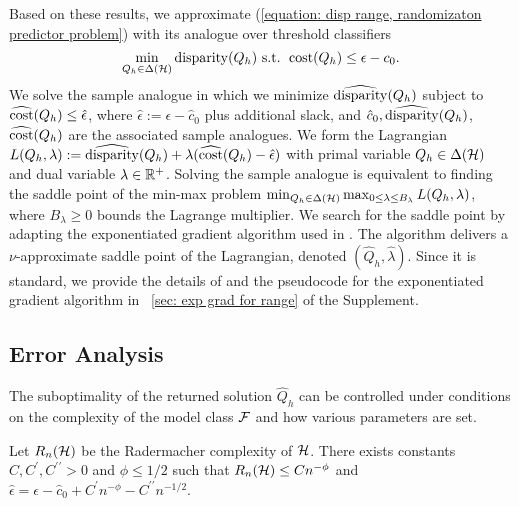 \documentclass{article}
\begin{document}
Based on these results, we approximate (\ref{equation: disp range, randomizaton predictor problem}) with its analogue over threshold classifiers
    \begin{equation}\label{equation: discretized problem for extremes}
        \min_{Q_h \in \Delta(\mathcal{H})} \operatorname{disparity}(Q_h) \mbox{ s.t. } \operatorname{cost}(Q_h) \leq \epsilon - c_0.
    \end{equation}
We solve the sample analogue in which we minimize $\widehat{\operatorname{disparity}}(Q_h)$ subject to $\widehat{\operatorname{cost}}(Q_h) \leq \hat{\epsilon}$, where $\hat{\epsilon} := \epsilon - \hat{c}_0$ plus additional slack, and $\hat{c}_0, \widehat{\operatorname{disparity}}(Q_h)$, $\widehat{\operatorname{cost}}(Q_h)$ are the associated sample analogues. We form the Lagrangian $L(Q_h, \lambda) := \widehat{\operatorname{disparity}}(Q_h) + \lambda (\widehat{\operatorname{cost}}(Q_h) - \hat{\epsilon})$ with primal variable $Q_h \in \Delta(\mathcal{H})$ and dual variable $\lambda \in \mathbb{R}^{+}$. Solving the sample analogue is equivalent to finding the saddle point of the min-max problem $ \min_{Q_h \in \Delta(\mathcal{H})} \max_{0 \leq \lambda \leq B_\lambda} L(Q_h, \lambda)$, where $B_\lambda \geq 0$ bounds the Lagrange multiplier. We search for the saddle point by adapting the exponentiated gradient algorithm used in \cite{agarwal2018reductions, AgarwalEtAl(19)-FairRegression}. The algorithm delivers a $\nu$-approximate saddle point of the Lagrangian, denoted $(\hat{Q}_h, \hat{\lambda})$. Since it is standard, we provide the details of and the pseudocode for the exponentiated gradient algorithm in \textsection~\ref{sec: exp grad for range} of the Supplement.

\subsection{Error Analysis}

The suboptimality of the returned solution $\hat{Q}_h$ can be controlled under conditions on the complexity of the model class $\mathcal{F}$ and how various parameters are set. 

\begin{assumption}\label{assumption: error analysis for exp grad extremes}
    Let $R_n(\mathcal{H})$ be the Radermacher complexity of $\mathcal{H}$. There exists constants $C, C^\prime, C^{\prime \prime} > 0$ and $\phi \leq 1/2$ such that $R_n(\mathcal{H}) \leq C n^{-\phi}$ and $\hat{\epsilon} = \epsilon - \hat{c}_0 + C^\prime n^{-\phi} - C^{\prime \prime} n^{-1/2}$.
\end{assumption}
\end{document}
